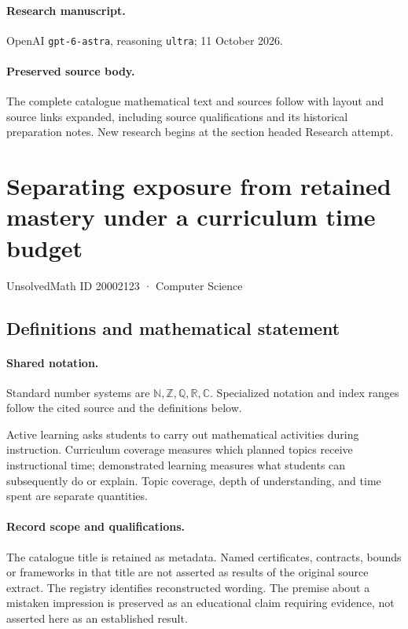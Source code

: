 \documentclass[11pt]{article}
\begin{document}
\paragraph{Research manuscript.} OpenAI \texttt{gpt-6-astra}, reasoning \texttt{ultra}; 11 October 2026.
\paragraph{Preserved source body.} The complete catalogue mathematical text and sources follow with layout and source links expanded, including source qualifications and its historical preparation notes. New research begins at the section headed Research attempt.

\section{Separating exposure from retained mastery under a curriculum time budget}\label{20002123}
{\small UnsolvedMath ID 20002123 · Computer Science}
\subsection{Definitions and mathematical statement}

\paragraph{Shared notation.}Standard number systems are $\mathbb N,\mathbb Z,\mathbb Q,\mathbb R,\mathbb C$. Specialized notation and index ranges follow the cited source and the definitions below.


Active learning asks students to carry out mathematical activities during instruction. Curriculum coverage measures which planned topics receive instructional time; demonstrated learning measures what students can subsequently do or explain. Topic coverage, depth of understanding, and time spent are separate quantities.
\paragraph{Record scope and qualifications.}
The catalogue title is retained as metadata. Named certificates, contracts, bounds or frameworks in that title are not asserted as results of the original source extract.
The registry identifies reconstructed wording. The premise about a mistaken impression is preserved as an educational claim requiring evidence, not asserted here as an established result.
\end{document}
